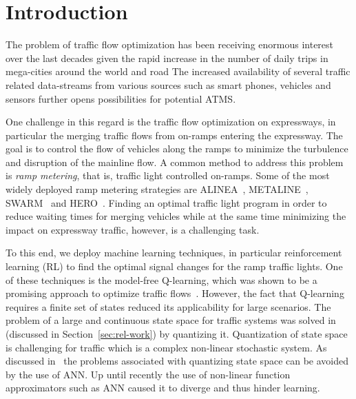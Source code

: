 \documentclass[conference]{IEEEtran}
\begin{document}
\IEEEpeerreviewmaketitle

\section{Introduction}
\label{sec:intro}
The problem of traffic flow optimization has been receiving enormous interest over the last decades given the rapid increase in the number of daily trips in mega-cities around the world and road 
The increased availability of several traffic related data-streams from various sources such as smart phones, vehicles and sensors further opens possibilities  for potential \ac{ATMS}.

One challenge in this regard is the traffic flow optimization on expressways, in particular the merging traffic flows from on-ramps entering the expressway.
The goal is to control the flow of vehicles along the ramps to minimize the turbulence and disruption of the mainline flow. A common method to address this problem is {\it ramp metering}, that is, traffic light controlled on-ramps. Some of the most widely deployed ramp metering strategies are ALINEA~\cite{papageorgiou1991alinea}, METALINE~\cite{papageorgiou1997alinea}, SWARM~\cite{paesani1997system} and HERO~\cite{papamichail2010heuristic}.
Finding an optimal traffic light program in order to reduce waiting times for merging vehicles while at the same time minimizing the impact on expressway traffic, however, is a challenging task.

To this end, we deploy machine learning techniques, in particular reinforcement learning (RL)  to find the optimal signal changes for the ramp traffic lights.
One of these techniques is the model-free Q-learning, which was shown to be a promising approach to optimize traffic flows~\cite{abdulhai2003reinforcement}.
However, the fact that Q-learning requires a finite set of states reduced its applicability for large scenarios. The problem of a large and continuous state space for traffic systems was solved in~\cite{balaji2010urban,prashanth2011reinforcement} (discussed in Section~\ref{sec:rel-work}) by quantizing it. Quantization of state space is challenging for traffic which is a complex non-linear stochastic system.  As discussed in~\cite{santamaria1997experiments} the problems associated with quantizing state space can be avoided by the use of \ac{ANN}. Up until recently the use of non-linear function approximators such as ANN caused it to diverge and thus hinder learning. 
\end{document}
